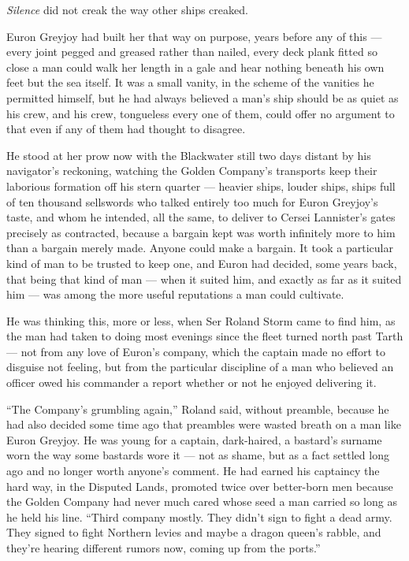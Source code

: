 \textit{Silence} did not creak the way other ships creaked.

Euron Greyjoy had built her that way on purpose, years before any of this — every joint pegged and greased rather than nailed, every deck plank fitted so close a man could walk her length in a gale and hear nothing beneath his own feet but the sea itself. It was a small vanity, in the scheme of the vanities he permitted himself, but he had always believed a man’s ship should be as quiet as his crew, and his crew, tongueless every one of them, could offer no argument to that even if any of them had thought to disagree.

He stood at her prow now with the Blackwater still two days distant by his navigator’s reckoning, watching the Golden Company’s transports keep their laborious formation off his stern quarter — heavier ships, louder ships, ships full of ten thousand sellswords who talked entirely too much for Euron Greyjoy’s taste, and whom he intended, all the same, to deliver to Cersei Lannister’s gates precisely as contracted, because a bargain kept was worth infinitely more to him than a bargain merely made. Anyone could make a bargain. It took a particular kind of man to be trusted to keep one, and Euron had decided, some years back, that being that kind of man — when it suited him, and exactly as far as it suited him — was among the more useful reputations a man could cultivate.

He was thinking this, more or less, when Ser Roland Storm came to find him, as the man had taken to doing most evenings since the fleet turned north past Tarth — not from any love of Euron’s company, which the captain made no effort to disguise not feeling, but from the particular discipline of a man who believed an officer owed his commander a report whether or not he enjoyed delivering it.

“The Company’s grumbling again,” Roland said, without preamble, because he had also decided some time ago that preambles were wasted breath on a man like Euron Greyjoy. He was young for a captain, dark-haired, a bastard’s surname worn the way some bastards wore it — not as shame, but as a fact settled long ago and no longer worth anyone’s comment. He had earned his captaincy the hard way, in the Disputed Lands, promoted twice over better-born men because the Golden Company had never much cared whose seed a man carried so long as he held his line. “Third company mostly. They didn’t sign to fight a dead army. They signed to fight Northern levies and maybe a dragon queen’s rabble, and they’re hearing different rumors now, coming up from the ports.”

